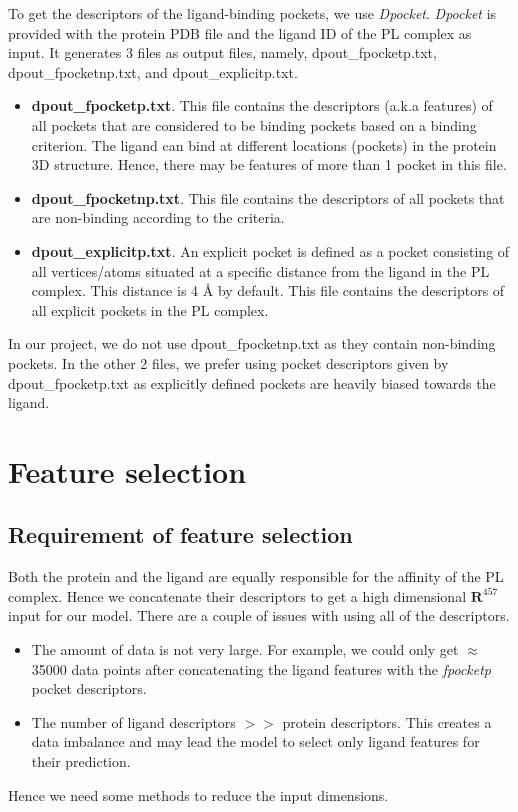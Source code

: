 \documentclass[11pt]{article}
\begin{document}
To get the descriptors of the ligand-binding pockets,  we use \textit{Dpocket}.
\textit{Dpocket} is provided with the protein PDB file and the ligand ID of the PL complex as input.
It generates 3 files as output files,  namely,  dpout\_fpocketp.txt, dpout\_fpocketnp.txt,  and  dpout\_explicitp.txt.
\begin{itemize}
\item \textbf{dpout\_fpocketp.txt}.
This file contains the descriptors (a.k.a features) of all pockets that are considered to be binding pockets based on a binding criterion.
The ligand can bind at different locations (pockets) in the protein 3D structure.
Hence,  there may be features of more than 1 pocket in this file.
\item \textbf{dpout\_fpocketnp.txt}.  This file contains the descriptors of all pockets that are non-binding according to the criteria.
\item \textbf{dpout\_explicitp.txt}.  An explicit pocket is defined as a pocket consisting of all vertices/atoms situated at a specific distance from the ligand in the PL complex.
This distance is 4 \r{A} by default.
This file contains the descriptors of all explicit pockets in the PL complex. 
\end{itemize}

In our project, we do not use dpout\_fpocketnp.txt as they contain non-binding pockets.
In the other 2 files,  we prefer using pocket descriptors given by dpout\_fpocketp.txt as explicitly defined pockets are heavily biased towards the ligand.

\section{Feature selection}
\subsection{Requirement of feature selection}
Both the protein and the ligand are equally responsible for the affinity of the PL complex.
Hence we concatenate their descriptors to get a high dimensional $\mathbf{R}^{457}$ input for our model.
There are a couple of issues with using all of the descriptors.
\begin{itemize}
\item The amount of data is not very large. 
For example,  we could only get $\approx$ 35000 data points after concatenating the ligand features with the \textit{fpocketp} pocket descriptors.
\item The number of ligand descriptors $>>$ protein descriptors.
This creates a data imbalance and may lead the model to select only ligand features for their prediction.
\end{itemize}
Hence we need some methods to reduce the input dimensions.
\end{document}
